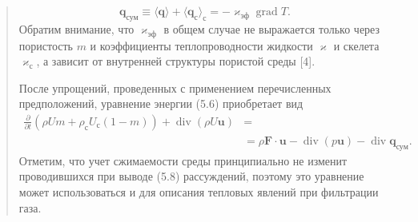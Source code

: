 \documentclass[12pt,a4paper]{article}
\DeclareMathOperator{\grad}{grad}
\DeclareMathOperator{\Div}{div}
\newenvironment{textquote}{\begin{quote}\sloppy}{\end{quote}}
\begin{document}
\begin{textquote}
\begin{enumerate}
\begin{equation}
\boldsymbol{q}_{\text{сум}}\equiv\langle\boldsymbol{q}\rangle+\langle\boldsymbol{q}_{\text{с}}\rangle_{\text{с}}=-\varkappa_{\text{эф}}\grad T.
\tag{5.7}\label{q3:eq-5-7}
\end{equation}
Обратим внимание, что $\varkappa_{\text{эф}}$ в общем случае не выражается только через пористость $m$ и коэффициенты теплопроводности жидкости $\varkappa$ и скелета $\varkappa_{\text{с}}$, а зависит от внутренней структуры пористой среды [4].
\end{enumerate}
После упрощений, проведенных с применением перечисленных предположений, уравнение энергии (5.6) приобретает вид
\begin{equation}
\begin{aligned}
\frac{\partial}{\partial t}(\rho Um+\rho_{\text{с}}U_{\text{с}}(1-m))+\Div(\rho U\boldsymbol{u})&=\\
&=\rho\boldsymbol{F}\cdot\boldsymbol{u}-\Div(p\boldsymbol{u})-\Div\boldsymbol{q}_{\text{сум}}.
\end{aligned}
\tag{5.8}\label{q3:eq-5-8}
\end{equation}
Отметим, что учет сжимаемости среды принципиально не изменит проводившихся при выводе (5.8) рассуждений, поэтому это уравнение может использоваться и для описания тепловых явлений при фильтрации газа.
\end{textquote}
\end{document}

